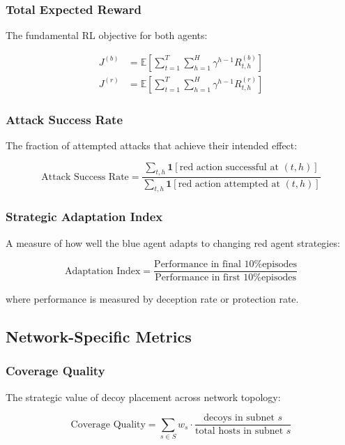\documentclass[11pt]{article}
\theoremstyle{definition}
\theoremstyle{plain}
\newcommand{\EE}{\mathbb{E}}
\begin{document}
\subsubsection{Total Expected Reward}
The fundamental RL objective for both agents:

\begin{align}
J^{(b)} &= \EE\left[\sum_{t=1}^{T} \sum_{h=1}^{H} \gamma^{h-1} R_{t,h}^{(b)}\right] \\
J^{(r)} &= \EE\left[\sum_{t=1}^{T} \sum_{h=1}^{H} \gamma^{h-1} R_{t,h}^{(r)}\right]
\end{align}

\subsubsection{Attack Success Rate}
The fraction of attempted attacks that achieve their intended effect:

\begin{equation}
\text{Attack Success Rate} = \frac{\sum_{t,h} \mathbf{1}[\text{red action successful at } (t,h)]}{\sum_{t,h} \mathbf{1}[\text{red action attempted at } (t,h)]}
\end{equation}

\subsubsection{Strategic Adaptation Index}
A measure of how well the blue agent adapts to changing red agent strategies:

\begin{equation}
\text{Adaptation Index} = \frac{\text{Performance in final 10\% episodes}}{\text{Performance in first 10\% episodes}}
\end{equation}

where performance is measured by deception rate or protection rate.

\subsection{Network-Specific Metrics}

\subsubsection{Coverage Quality}
The strategic value of decoy placement across network topology:

\begin{equation}
\text{Coverage Quality} = \sum_{s \in S} w_s \cdot \frac{\text{decoys in subnet } s}{\text{total hosts in subnet } s}
\end{equation}
\end{document}
